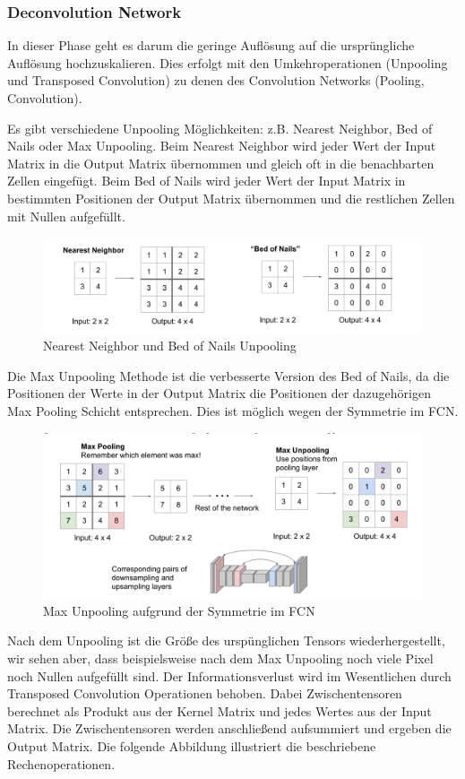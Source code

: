 \subsubsection{Deconvolution Network}
In dieser Phase geht es darum die geringe Auflösung auf die ursprüngliche Auflösung hochzuskalieren. Dies erfolgt mit den Umkehroperationen (Unpooling und Transposed Convolution) zu denen des Convolution Networks (Pooling, Convolution).

Es gibt verschiedene Unpooling Möglichkeiten: z.B. Nearest Neighbor, Bed of Nails oder Max Unpooling. Beim Nearest Neighbor wird jeder Wert der Input Matrix in die Output Matrix übernommen und gleich oft in die benachbarten Zellen eingefügt.  Beim Bed of Nails wird jeder Wert der Input Matrix in bestimmten Positionen der Output Matrix übernommen und die restlichen Zellen mit Nullen aufgefüllt.
\begin{figure}[H]
\centering
\includegraphics[width=\textwidth]{pic/Segmentierung/NearestNeighbor_BedoofNails.png}
\caption{\label{pic:NN_BoN} Nearest Neighbor und Bed of Nails Unpooling}
\end{figure}
Die Max Unpooling Methode ist die verbesserte Version des Bed of Nails, da die Positionen der Werte in der Output Matrix die Positionen der dazugehörigen Max Pooling Schicht entsprechen. Dies ist möglich wegen der Symmetrie im FCN. 
\begin{figure}[H]
\centering
\includegraphics[width=\textwidth]{pic/Segmentierung/MaxUnpooling.png}
\caption{\label{pic:MaxUnpooling} Max Unpooling aufgrund der Symmetrie im FCN}
\end{figure}
Nach dem Unpooling ist die Größe des urspünglichen Tensors wiederhergestellt, wir sehen aber, dass beispielsweise nach dem Max Unpooling noch viele Pixel noch Nullen aufgefüllt sind. Der Informationsverlust wird im Wesentlichen durch Transposed Convolution Operationen behoben. Dabei Zwischentensoren berechnet als Produkt aus der Kernel Matrix und jedes Wertes aus der Input Matrix. Die Zwischentensoren werden anschließend aufsummiert und ergeben die Output Matrix. Die folgende Abbildung illustriert die beschriebene Rechenoperationen.

